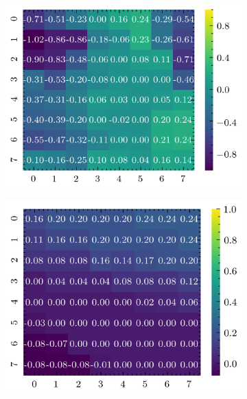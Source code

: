 \begin{figure}[H]
\begin{subfigure}[b]{0.19\textwidth}
        \includegraphics[width=\linewidth]{../img/5/quarry/false_positive/heatmap-2d-2.png}
    \end{subfigure}
    \begin{subfigure}[b]{0.19\textwidth}
        \includegraphics[width=\linewidth]{../img/5/quarry/false_positive/heatmap-2d-3.png}
    \end{subfigure}  
    \begin{subfigure}[b]{0.19\textwidth}

\end{subfigure}
\end{figure}
